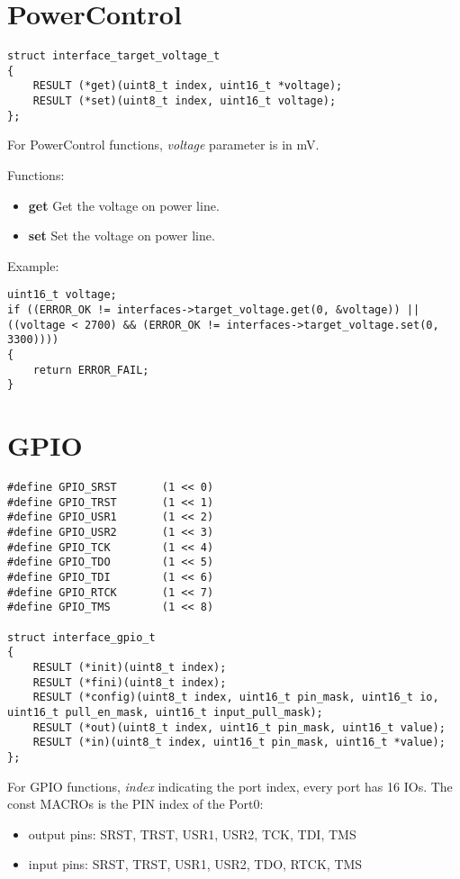 \documentclass[a4paper,12pt]{book}
\begin{document}
\newpage
\section{PowerControl}
\begin{lstlisting}
struct interface_target_voltage_t
{
	RESULT (*get)(uint8_t index, uint16_t *voltage);
	RESULT (*set)(uint8_t index, uint16_t voltage);
};
\end{lstlisting}
For PowerControl functions, \emph{voltage} parameter is in mV.

\vspace{6pt}
Functions:
\begin{itemize}
\item \textbf{get}
Get the voltage on power line.
\item \textbf{set}
Set the voltage on power line.
\end{itemize}

\vspace{6pt}
Example:
\begin{lstlisting}
uint16_t voltage;
if ((ERROR_OK != interfaces->target_voltage.get(0, &voltage)) || ((voltage < 2700) && (ERROR_OK != interfaces->target_voltage.set(0, 3300))))
{
	return ERROR_FAIL;
}
\end{lstlisting}

\newpage
\section{GPIO}
\begin{lstlisting}
#define GPIO_SRST		(1 << 0)
#define GPIO_TRST		(1 << 1)
#define GPIO_USR1		(1 << 2)
#define GPIO_USR2		(1 << 3)
#define GPIO_TCK		(1 << 4)
#define GPIO_TDO		(1 << 5)
#define GPIO_TDI		(1 << 6)
#define GPIO_RTCK		(1 << 7)
#define GPIO_TMS		(1 << 8)

struct interface_gpio_t
{
	RESULT (*init)(uint8_t index);
	RESULT (*fini)(uint8_t index);
	RESULT (*config)(uint8_t index, uint16_t pin_mask, uint16_t io, uint16_t pull_en_mask, uint16_t input_pull_mask);
	RESULT (*out)(uint8_t index, uint16_t pin_mask, uint16_t value);
	RESULT (*in)(uint8_t index, uint16_t pin_mask, uint16_t *value);
};
\end{lstlisting}
For GPIO functions, \emph{index} indicating the port index, every port has 16 IOs. The const MACROs is the PIN index of the Port0:
\begin{itemize}
\item output pins: SRST, TRST, USR1, USR2, TCK, TDI, TMS
\item input pins: SRST, TRST, USR1, USR2, TDO, RTCK, TMS
\end{itemize}
\end{document}
